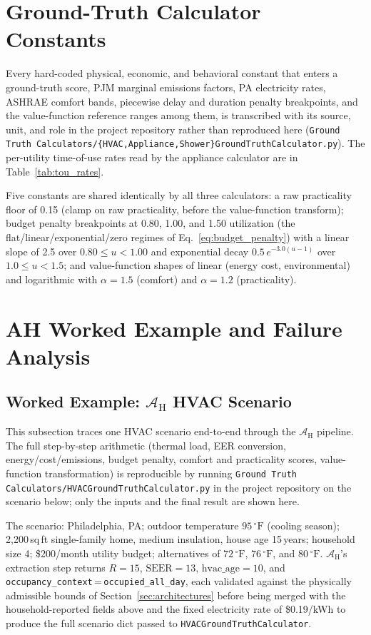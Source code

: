 \documentclass[final,3p,times]{elsarticle}
\begin{document}
\section{Ground-Truth Calculator Constants}
\label{app:calculator_constants}

Every hard-coded physical, economic, and behavioral constant that enters a ground-truth score, PJM marginal emissions factors, PA electricity rates, ASHRAE comfort bands, piecewise delay and duration penalty breakpoints, and the value-function reference ranges among them, is transcribed with its source, unit, and role in the project repository rather than reproduced here (\texttt{Ground Truth Calculators/\{HVAC,Appliance,Shower\}GroundTruthCalculator.py}). The per-utility time-of-use rates read by the appliance calculator are in Table~\ref{tab:tou_rates}.

Five constants are shared identically by all three calculators: a raw practicality floor of 0.15 (clamp on raw practicality, before the value-function transform); budget penalty breakpoints at 0.80, 1.00, and 1.50 utilization (the flat/linear/exponential/zero regimes of Eq.~\ref{eq:budget_penalty}) with a linear slope of 2.5 over $0.80 \le u < 1.00$ and exponential decay $0.5\,e^{-3.0(u-1)}$ over $1.0 \le u < 1.5$; and value-function shapes of linear (energy cost, environmental) and logarithmic with $\alpha=1.5$ (comfort) and $\alpha=1.2$ (practicality).

\section{AH Worked Example and Failure Analysis}
\label{app:worked_example}
\subsection{Worked Example: \texorpdfstring{$\mathcal{A}_{\text{H}}$}{A_H} HVAC Scenario}
\label{app:hvac_worked}

This subsection traces one HVAC scenario end-to-end through the
$\mathcal{A}_{\text{H}}$ pipeline. The full step-by-step arithmetic
(thermal load, EER conversion, energy/cost/emissions, budget penalty,
comfort and practicality scores, value-function transformation) is
reproducible by running \texttt{Ground Truth Calculators/HVACGroundTruthCalculator.py}
in the project repository on the scenario below; only the inputs and the
final result are shown here.

The scenario: Philadelphia, PA; outdoor temperature $95\,^\circ\text{F}$
(cooling season); 2{,}200\,sq\,ft single-family home, medium insulation,
house age 15\,years; household size 4; \$200/month utility budget;
alternatives of $72\,^\circ\text{F}$, $76\,^\circ\text{F}$, and
$80\,^\circ\text{F}$. $\mathcal{A}_{\text{H}}$'s extraction step returns
$R=15$, $\text{SEER}=13$, $\text{hvac\_age}=10$, and
\texttt{occupancy\_context}\,=\,\texttt{occupied\_all\_day}, each validated
against the physically admissible bounds of Section~\ref{sec:architectures}
before being merged with the household-reported fields above and the fixed
electricity rate of \$0.19/kWh to produce the full scenario dict passed to
\texttt{HVACGroundTruthCalculator}.
\end{document}
